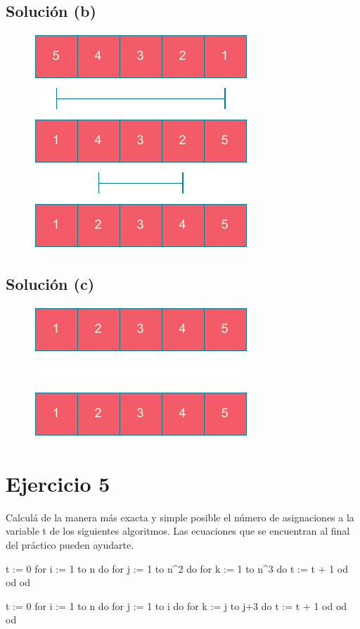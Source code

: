 \documentclass{article}
\begin{document}
\subsection{Solución (b)}
\begin{figure}[h]
    \centering
    \includegraphics[scale=0.6]{estáticos/4b.pdf}
\end{figure}

\subsection{Solución (c)}
\begin{figure}[h]
    \centering
    \includegraphics[scale=0.6]{estáticos/4c.pdf}
\end{figure}

\section{Ejercicio 5}
Calculá de la manera más exacta y simple posible el número de asignaciones a la variable t de los siguientes algoritmos. Las ecuaciones que se encuentran al final del práctico pueden ayudarte.
\begin{codebox}
\begin{pascallike}
t := 0
for i := 1 to n do
    for j := 1 to n^2 do
    for k := 1 to n^3 do
        t := t + 1
    od
    od
od
\end{pascallike}
\end{codebox}
\begin{codebox}
\begin{pascallike}
t := 0
for i := 1 to n do
    for j := 1 to i do
    for k := j to j+3 do
        t := t + 1
    od
    od
od
\end{pascallike}
\end{codebox}
\end{document}
